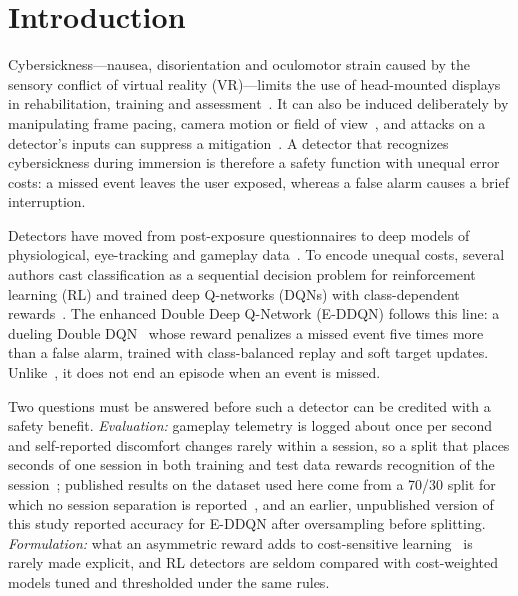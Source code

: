 \section{Introduction}
\label{sec:intro}
Cybersickness---nausea, disorientation and oculomotor strain caused by the sensory conflict of virtual reality (VR)---limits the use of head-mounted displays in rehabilitation, training and assessment~\cite{caserman2021cybersickness}. It can also be induced deliberately by manipulating frame pacing, camera motion or field of view~\cite{tseng2022dark,odeleye2021framerate}, and attacks on a detector's inputs can suppress a mitigation~\cite{kundu2025securing}. A detector that recognizes cybersickness during immersion is therefore a safety function with unequal error costs: a missed event leaves the user exposed, whereas a false alarm causes a brief interruption.

Detectors have moved from post-exposure questionnaires to deep models of physiological, eye-tracking and gameplay data~\cite{dennison2016physio,islam2020automatic,islam2021fusion,liu2024cnneca,yalcin2024automatic,jeong2024precyse}. To encode unequal costs, several authors cast classification as a sequential decision problem for reinforcement learning (RL) and trained deep Q-networks (DQNs) with class-dependent rewards~\cite{lin2020imbalanced,yang2024drlimbalanced}. The enhanced Double Deep Q-Network (E-DDQN) follows this line: a dueling Double DQN~\cite{vanhasselt2016double,wang2016dueling} whose reward penalizes a missed event five times more than a false alarm, trained with class-balanced replay and soft target updates. Unlike~\cite{lin2020imbalanced,yang2024drlimbalanced}, it does not end an episode when an event is missed.

Two questions must be answered before such a detector can be credited with a safety benefit. \emph{Evaluation:} gameplay telemetry is logged about once per second and self-reported discomfort changes rarely within a session, so a split that places seconds of one session in both training and test data rewards recognition of the session~\cite{kapoor2023leakage}; published results on the dataset used here come from a 70/30 split for which no session separation is reported~\cite{kundu2022truvr}, and an earlier, unpublished version of this study reported  accuracy for E-DDQN after oversampling before splitting. \emph{Formulation:} what an asymmetric reward adds to cost-sensitive learning~\cite{elkan2001cost} is rarely made explicit, and RL detectors are seldom compared with cost-weighted models tuned and thresholded under the same rules.

